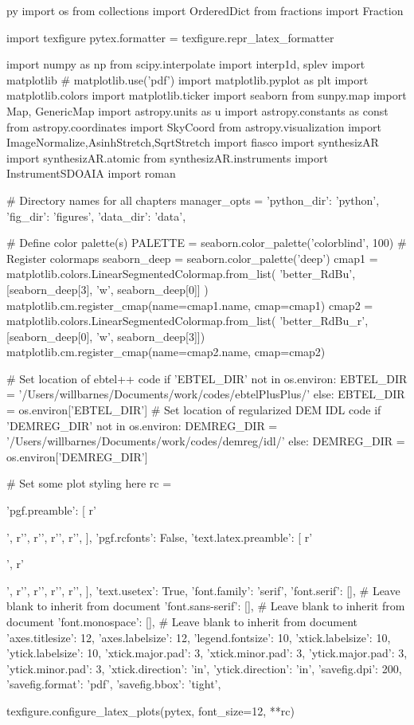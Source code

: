 \begin{pythontexcustomcode}{py}
import os
from collections import OrderedDict
from fractions import Fraction

import texfigure
pytex.formatter = texfigure.repr_latex_formatter

import numpy as np
from scipy.interpolate import interp1d, splev
import matplotlib
# matplotlib.use('pdf')
import matplotlib.pyplot as plt
import matplotlib.colors
import matplotlib.ticker
import seaborn
from sunpy.map import Map, GenericMap
import astropy.units as u
import astropy.constants as const
from astropy.coordinates import SkyCoord
from astropy.visualization import ImageNormalize,AsinhStretch,SqrtStretch
import fiasco
import synthesizAR
import synthesizAR.atomic
from synthesizAR.instruments import InstrumentSDOAIA
import roman

# Directory names for all chapters
manager_opts = {'python_dir': 'python', 'fig_dir': 'figures', 'data_dir': 'data',}

# Define color palette(s)
PALETTE = seaborn.color_palette('colorblind', 100)
#  Register colormaps
seaborn_deep = seaborn.color_palette('deep')
cmap1 = matplotlib.colors.LinearSegmentedColormap.from_list(
    'better_RdBu', [seaborn_deep[3], 'w', seaborn_deep[0]]
)
matplotlib.cm.register_cmap(name=cmap1.name, cmap=cmap1)
cmap2 = matplotlib.colors.LinearSegmentedColormap.from_list(
    'better_RdBu_r', [seaborn_deep[0], 'w', seaborn_deep[3]])
matplotlib.cm.register_cmap(name=cmap2.name, cmap=cmap2)

# Set location of ebtel++ code
if 'EBTEL_DIR' not in os.environ:
	EBTEL_DIR = '/Users/willbarnes/Documents/work/codes/ebtelPlusPlus/'
else:
	EBTEL_DIR = os.environ['EBTEL_DIR']
# Set location of regularized DEM IDL code
if 'DEMREG_DIR' not in os.environ:
	DEMREG_DIR = '/Users/willbarnes/Documents/work/codes/demreg/idl/'
else:
	DEMREG_DIR = os.environ['DEMREG_DIR']

# Set some plot styling here
rc = {
	'pgf.preamble': [
		r'\usepackage{siunitx}',
		r'\DeclareSIUnit[number-unit-product={}]',
		r'\DeclareSIUnit[number-unit-product={}]',
		r'\DeclareSIUnit[number-unit-product={}]',
		r'\DeclareSIUnit[number-unit-product={}]',
	],
	'pgf.rcfonts': False,
	'text.latex.preamble': [
		r'\usepackage{mathpazo}',
		r'\usepackage{siunitx}',
		r'\DeclareSIUnit[number-unit-product={}]',
		r'\DeclareSIUnit[number-unit-product={}]',
		r'\DeclareSIUnit[number-unit-product={}]',
		r'\DeclareSIUnit[number-unit-product={}]',
	],
	'text.usetex': True,
	'font.family': 'serif',
	'font.serif': [], # Leave blank to inherit from document
	'font.sans-serif': [], # Leave blank to inherit from document
	'font.monospace': [], # Leave blank to inherit from document
	'axes.titlesize': 12,
	'axes.labelsize': 12,
	'legend.fontsize': 10,
	'xtick.labelsize': 10,
	'ytick.labelsize': 10,
	'xtick.major.pad': 3,
	'xtick.minor.pad': 3,
	'ytick.major.pad': 3,
	'ytick.minor.pad': 3,
	'xtick.direction': 'in',
	'ytick.direction': 'in',
	'savefig.dpi': 200,
	'savefig.format': 'pdf',
	'savefig.bbox': 'tight',
}
texfigure.configure_latex_plots(pytex, font_size=12, **rc)

\end{pythontexcustomcode}
